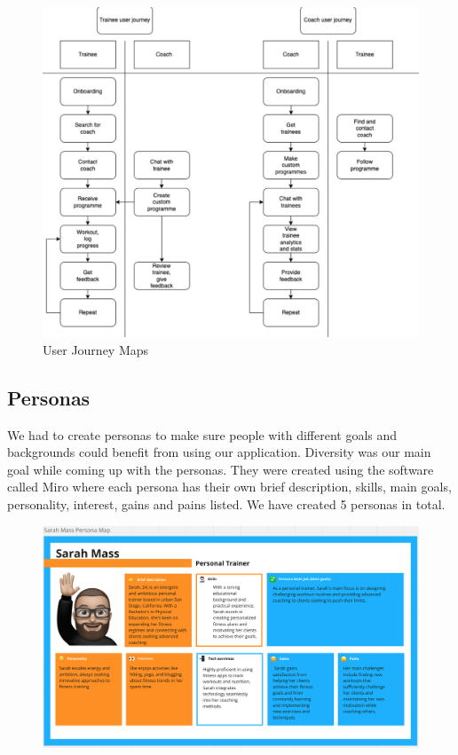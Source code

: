 \begin{figure}[H]
    \centering
    \includegraphics[width=1\textwidth]{Resources/UserJourneyMaps.png}
    \caption{User Journey Maps}
    \label{fig:UserJourneyMaps}
  \end{figure}


\subsection{Personas}
We had to create personas to make sure people with different goals and backgrounds could benefit from using our application. Diversity was our main goal while coming up with the personas. They were created using the software called Miro where each persona has their own brief description, skills, main goals, personality, interest, gains and pains listed. We have created 5 personas in total. 



  \begin{figure}[H]
    \centering
    \includegraphics[width=1\textwidth]{Resources/SarahMass.png}
  \end{figure}

